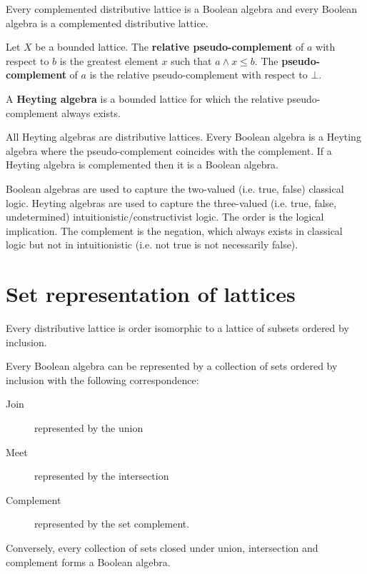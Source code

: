 \documentclass{article}
\newcommand{\marginleft}[1] {\reversemarginpar\marginpar{#1}}
\begin{document}
\begin{prop}
	Every complemented distributive lattice is a Boolean algebra and every Boolean algebra is a complemented distributive lattice.
\end{prop}

\begin{defn}
	Let $X$ be \marginleft{Pseudo-complement} a bounded lattice. The \textbf{relative pseudo-complement} of $a$ with respect to $b$ is the greatest element $x$ such that $a \wedge x \leq b$. The \textbf{pseudo-complement} of $a$ is the relative pseudo-complement with respect to $\bot$.
\end{defn}

\begin{defn}
	A \textbf{Heyting algebra} \marginleft{Heyting \\ algebra} is a bounded lattice for which the relative pseudo-complement always exists.
\end{defn}

\begin{prop}
	All Heyting algebras are distributive lattices. Every Boolean algebra is a Heyting algebra where the pseudo-complement coincides with the complement. If a Heyting algebra is complemented then it is a Boolean algebra.
\end{prop}

\begin{remark}
	Boolean algebras are used to capture the two-valued (i.e. true, false) classical logic. Heyting algebras are used to capture the three-valued (i.e. true, false, undetermined) intuitionistic/constructivist logic. The order is the logical implication. The complement is the negation, which always exists in classical logic but not in intuitionistic (i.e. not true is not necessarily false).
\end{remark}

\section{Set representation of lattices}

\begin{prop}
	Every distributive lattice is order isomorphic to a lattice of subsets ordered by inclusion.
\end{prop}

\begin{prop}
	Every Boolean algebra can be represented by a collection of sets ordered by inclusion with the following correspondence:
	\begin{description}
		\item[Join] represented by the union
		\item[Meet] represented by the intersection
		\item[Complement] represented by the set complement.
	\end{description}
	Conversely, every collection of sets closed under union, intersection and complement forms a Boolean algebra.
\end{prop}
\end{document}
